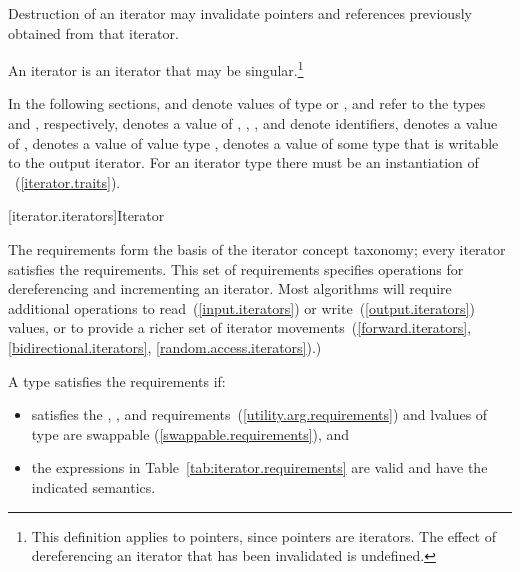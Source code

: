 \pnum
Destruction of an iterator may invalidate pointers and references
previously obtained from that iterator.

\pnum
An
iterator is an iterator that may be singular.\footnote{This definition applies to pointers, since pointers are iterators.
The effect of dereferencing an iterator that has been invalidated
is undefined.
}

\pnum
In the following sections,
and
denote values of type
 or ,
 and  refer to the
types  and
, respectively,
denotes a value of
,
,
,
and
denote identifiers,
denotes a value of
,
denotes a value of value type
,
denotes a value of some type that is writable to the output iterator.
\enternote For an iterator type  there must be an instantiation
of ~(\ref{iterator.traits}). \exitnote

[iterator.iterators]{Iterator}

\pnum
The  requirements form the basis of the iterator concept
taxonomy; every iterator satisfies the  requirements. This
set of requirements specifies operations for dereferencing and incrementing
an iterator. Most algorithms will require additional operations to
read~(\ref{input.iterators}) or write~(\ref{output.iterators}) values, or
to provide a richer set of iterator movements~(\ref{forward.iterators},
\ref{bidirectional.iterators}, \ref{random.access.iterators}).)

\pnum
A type  satisfies the  requirements if:

\begin{itemize}
\item {} satisfies the , , and
 requirements~(\ref{utility.arg.requirements}) and lvalues
of type  are swappable (\ref{swappable.requirements}), and

\item the expressions in Table~\ref{tab:iterator.requirements} are valid and have
the indicated semantics.
\end{itemize}

